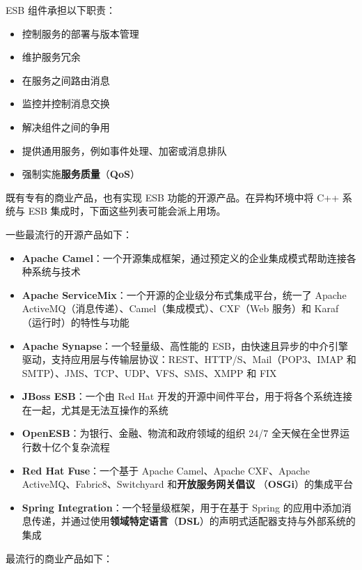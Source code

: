 ESB 组件承担以下职责：

\begin{itemize}
\item 控制服务的部署与版本管理
\item 维护服务冗余
\item 在服务之间路由消息
\item 监控并控制消息交换
\item 解决组件之间的争用
\label{idx:1316}
\item 提供通用服务，例如事件处理、加密或消息排队
\item 强制实施\textbf{服务质量}（\textbf{QoS}）
\end{itemize}

\label{idx:1317}
既有专有的商业产品，也有实现 ESB 功能的开源产品。在异构环境中将 C++ 系统与 ESB 集成时，下面这些列表可能会派上用场。

一些最流行的开源产品如下：

\begin{itemize}
\label{idx:1318}
\item \textbf{Apache Camel}：一个开源集成框架，通过预定义的企业集成模式帮助连接各种系统与技术
\label{idx:1319}
\item \textbf{Apache ServiceMix}：一个开源的企业级分布式集成平台，统一了 Apache ActiveMQ（消息传递）、Camel（集成模式）、CXF（Web 服务）和 Karaf（运行时）的特性与功能
\label{idx:1320}
\item \textbf{Apache Synapse}：一个轻量级、高性能的 ESB，由快速且异步的中介引擎驱动，支持应用层与传输层协议：REST、HTTP/S、Mail（POP3、IMAP 和 SMTP）、JMS、TCP、UDP、VFS、SMS、XMPP 和 FIX
\label{idx:1321}
\item \textbf{JBoss ESB}：一个由 Red Hat 开发的开源中间件平台，用于将各个系统连接在一起，尤其是无法互操作的系统
\label{idx:1322}
\item \textbf{OpenESB}：为银行、金融、物流和政府领域的组织 24/7 全天候在全世界运行数十亿个复杂流程
\label{idx:1323}
\label{idx:1324}
\item \textbf{Red Hat Fuse}：一个基于 Apache Camel、Apache CXF、Apache ActiveMQ、Fabric8、Switchyard 和\textbf{开放服务网关倡议 }（\textbf{OSGi}）的集成平台
\label{idx:1325}
\label{idx:1326}
\item \textbf{Spring Integration}：一个轻量级框架，用于在基于 Spring 的应用中添加消息传递，并通过使用\textbf{领域特定语言}（\textbf{DSL}）的声明式适配器支持与外部系统的集成
\end{itemize}

最流行的商业产品如下：

